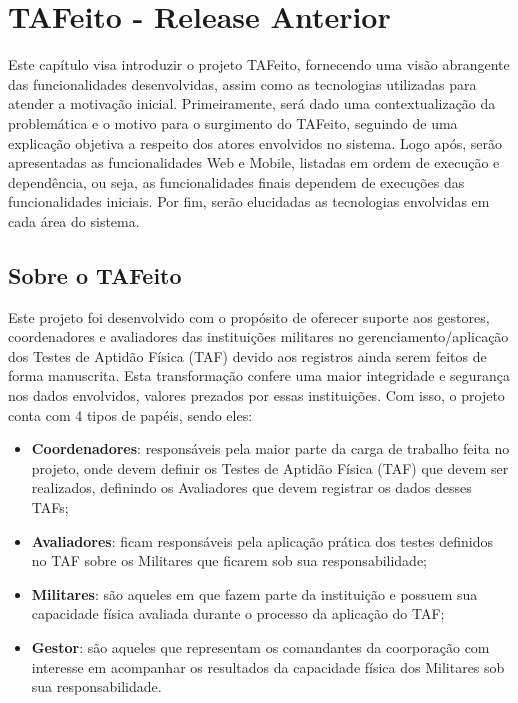 \chapter{TAFeito - Release Anterior}\label{release_anterior}

Este capítulo visa introduzir o projeto TAFeito, fornecendo uma visão abrangente das funcionalidades desenvolvidas, assim como as tecnologias utilizadas para atender a motivação inicial. Primeiramente, será dado uma contextualização da problemática e o motivo para o surgimento do TAFeito, seguindo de uma explicação objetiva a respeito dos atores envolvidos no sistema. Logo após, serão apresentadas as funcionalidades Web e Mobile, listadas em ordem de execução e dependência, ou seja, as funcionalidades finais dependem de execuções das funcionalidades iniciais. Por fim, serão elucidadas as tecnologias envolvidas em cada área do sistema.

\section{Sobre o TAFeito}

Este projeto foi desenvolvido com o propósito de oferecer suporte aos gestores, coordenadores e avaliadores das instituições militares no gerenciamento/aplicação dos Testes de Aptidão Física (TAF) devido aos registros ainda serem feitos de forma manuscrita. Esta transformação confere uma maior integridade e segurança nos dados envolvidos, valores prezados por essas instituições. Com isso, o projeto conta com 4 tipos de papéis, sendo eles:

\begin{itemize}
	\item \textbf{Coordenadores}: responsáveis pela maior parte da carga de trabalho feita no projeto, onde devem definir os Testes de Aptidão Física (TAF) que devem ser realizados, definindo os Avaliadores que devem registrar os dados desses TAFs;
	\item \textbf{Avaliadores}: ficam responsáveis pela aplicação prática dos testes definidos no TAF sobre os Militares que ficarem sob sua responsabilidade;
	\item \textbf{Militares}: são aqueles em que fazem parte da instituição e possuem sua capacidade física avaliada durante o processo da aplicação do TAF;
	\item \textbf{Gestor}: são aqueles que representam os comandantes da coorporação com interesse em acompanhar os resultados da capacidade física dos Militares sob sua responsabilidade.
\end{itemize}

